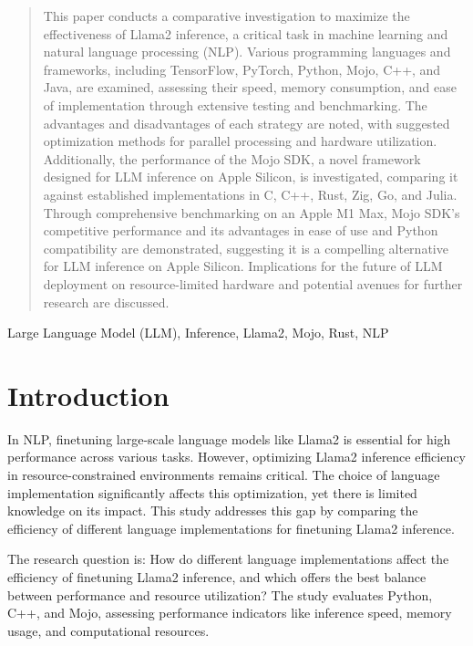 \documentclass[conference]{IEEEtran}
\begin{document}
\begin{abstract}
    This paper conducts a comparative investigation to maximize the effectiveness of Llama2 inference, a critical task in machine learning and natural language processing (NLP). Various programming languages and frameworks, including TensorFlow, PyTorch, Python, Mojo, C++, and Java, are examined, assessing their speed, memory consumption, and ease of implementation through extensive testing and benchmarking. The advantages and disadvantages of each strategy are noted, with suggested optimization methods for parallel processing and hardware utilization. Additionally, the performance of the Mojo SDK, a novel framework designed for LLM inference on Apple Silicon, is investigated, comparing it against established implementations in C, C++, Rust, Zig, Go, and Julia. Through comprehensive benchmarking on an Apple M1 Max, Mojo SDK's competitive performance and its advantages in ease of use and Python compatibility are demonstrated, suggesting it is a compelling alternative for LLM inference on Apple Silicon. Implications for the future of LLM deployment on resource-limited hardware and potential avenues for further research are discussed.
\end{abstract}

\begin{IEEEkeywords}
    Large Language Model (LLM), Inference, Llama2, Mojo, Rust, NLP
\end{IEEEkeywords}

\section{Introduction}
In NLP, finetuning large-scale language models like Llama2 is essential for high performance across various tasks. However, optimizing Llama2 inference efficiency in resource-constrained environments remains critical. The choice of language implementation significantly affects this optimization, yet there is limited knowledge on its impact. This study addresses this gap by comparing the efficiency of different language implementations for finetuning Llama2 inference.

The research question is: How do different language implementations affect the efficiency of finetuning Llama2 inference, and which offers the best balance between performance and resource utilization? The study evaluates Python, C++, and Mojo, assessing performance indicators like inference speed, memory usage, and computational resources.
\end{document}

